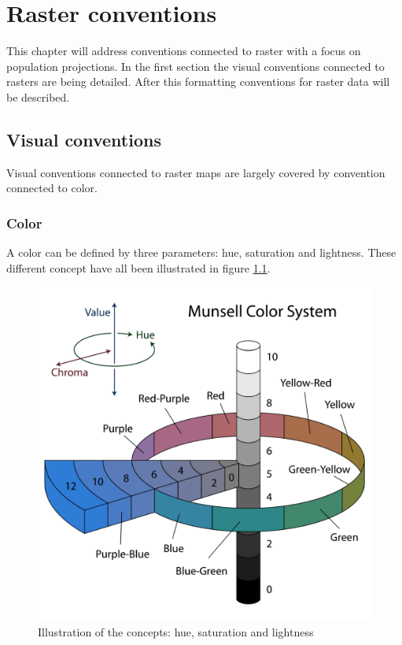 \chapter{Raster conventions}

This chapter will address conventions connected to raster with a focus on population projections. In the first section the visual conventions connected to rasters are being detailed. After this formatting conventions for raster data will be described.


\section{Visual conventions}

Visual conventions connected to raster maps are largely covered by convention connected to color. 
\subsection{Color}
A color can be defined by three parameters: hue, saturation and lightness. These different concept have all been illustrated in figure \ref{MunsellColorSystem}.

\begin{figure} [H]
	\centering
	\includegraphics[width=.8\textwidth]{Pictures/MunsellColorSystem}
	\caption{Illustration of the concepts: hue, saturation and lightness}
	\label{MunsellColorSystem}
\end{figure}

